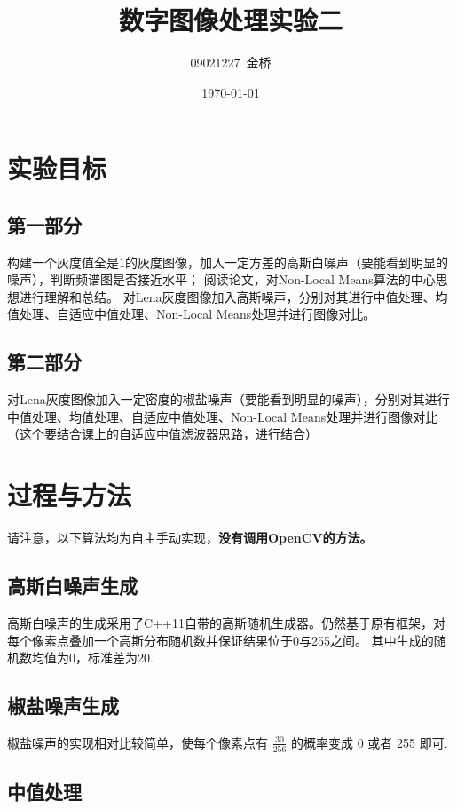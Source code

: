 \documentclass{article}
\title{数字图像处理实验二}
\author{09021227~金桥}
\date{\today}
\begin{document}
\maketitle

\section{实验目标}

\subsection{第一部分}
构建一个灰度值全是1的灰度图像，加入一定方差的高斯白噪声（要能看到明显的噪声），判断频谱图是否接近水平；
阅读论文，对Non-Local Means算法的中心思想进行理解和总结。
对Lena灰度图像加入高斯噪声，分别对其进行中值处理、均值处理、自适应中值处理、Non-Local Means处理并进行图像对比。

\subsection{第二部分}

对Lena灰度图像加入一定密度的椒盐噪声（要能看到明显的噪声），分别对其进行中值处理、均值处理、自适应中值处理、Non-Local Means处理并进行图像对比 （这个要结合课上的自适应中值滤波器思路，进行结合）

\section{过程与方法}

请注意，以下算法均为自主手动实现，\textbf{没有调用OpenCV的方法。}

\subsection{高斯白噪声生成}

高斯白噪声的生成采用了C++11自带的高斯随机生成器。仍然基于原有框架，对每个像素点叠加一个高斯分布随机数并保证结果位于0与255之间。
其中生成的随机数均值为0，标准差为20.
\subsection{椒盐噪声生成}

椒盐噪声的实现相对比较简单，使每个像素点有 $\frac{30}{256}$ 的概率变成 0 或者 255 即可.

\subsection{中值处理}
\end{document}
